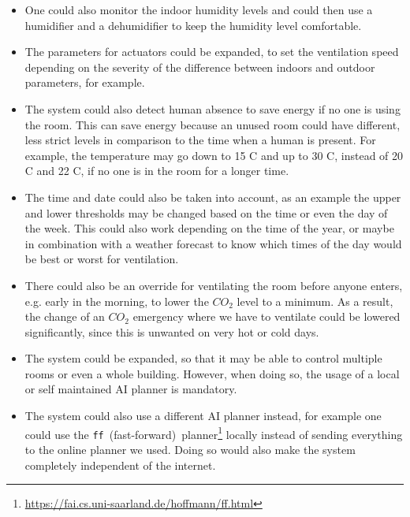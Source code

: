 \begin{itemize}
    \item One could also monitor the indoor humidity levels and could then use a humidifier and a dehumidifier to keep the humidity level comfortable.

    \item The parameters for actuators could be expanded, to set the ventilation speed depending on the severity of the difference between indoors and outdoor parameters, for example.

    \item The system could also detect human absence to save energy if no one is using the room.
    This can save energy because an unused room could have different, less strict levels in comparison to the time when a human is present.
    For example, the temperature may go down to 15 \textdegree C and up to 30 \textdegree C, instead of 20 \textdegree C and 22 \textdegree C, if no one is in the room for a longer time.

    \item The time and date could also be taken into account, as an example the upper and lower thresholds may be changed based on the time or even the day of the week.
    This could also work depending on the time of the year, or maybe in combination with a weather forecast to know which times of the day would be best or worst for ventilation.

    \item There could also be an override for ventilating the room before anyone enters, e.g. early in the morning, to lower the $CO_2$ level to a minimum.
    As a result, the change of an $CO_2$ emergency where we have to ventilate could be lowered significantly, since this is unwanted on very hot or cold days.

    \item The system could be expanded, so that it may be able to control multiple rooms or even a whole building.
    However, when doing so, the usage of a local or self maintained AI planner is mandatory.

    \item The system could also use a different AI planner instead, for example one could use the \texttt{ff}~(fast-forward)~planner\footnote{\url{https://fai.cs.uni-saarland.de/hoffmann/ff.html}} locally instead of sending everything to the online planner we used.
    Doing so would also make the system completely independent of the internet.
\end{itemize}

